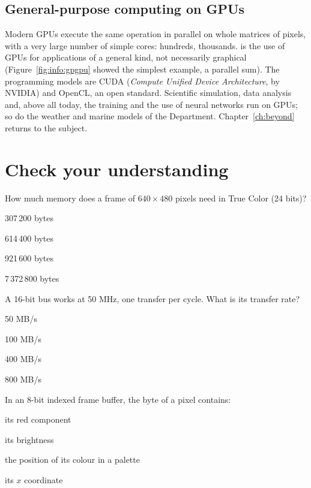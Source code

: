 \subsection{General-purpose computing on GPUs}

Modern GPUs execute the same operation in parallel on whole matrices of
pixels, with a very large number of simple cores: hundreds, thousands.
 is the use of GPUs for applications of a general kind, not
necessarily graphical (Figure~\ref{fig:info:gpgpu} showed the simplest
example, a parallel sum). The programming models are CUDA (\emph{Compute
Unified Device Architecture}, by NVIDIA) and OpenCL, an open standard.
Scientific simulation, data analysis and, above all today, the training and
the use of neural networks run on GPUs; so do the weather and marine models
of the Department. Chapter~\ref{ch:beyond} returns to the subject.





\section{Check your understanding}

\begin{quiz}{How much memory does a frame of $640\times 480$ pixels need in True Color (24 bits)?}
\item 307\,200 bytes
\item 614\,400 bytes
\item 921\,600 bytes
\item 7\,372\,800 bytes
\end{quiz}

\begin{quiz}{A 16-bit bus works at 50 MHz, one transfer per cycle. What is its transfer rate?}
\item 50 MB/s
\item 100 MB/s
\item 400 MB/s
\item 800 MB/s
\end{quiz}

\begin{quiz}{In an 8-bit indexed frame buffer, the byte of a pixel contains:}
\item its red component
\item its brightness
\item the position of its colour in a palette
\item its $x$ coordinate
\end{quiz}

